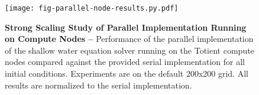
\begin{figure}

  \centering
  \texttt{[image: fig-parallel-node-results.py.pdf]}

  \caption{\textbf{Strong Scaling Study of Parallel Implementation
      Running on Compute Nodes --} Performance of the parallel
    implementation of the shallow water equation solver running on the
    Totient compute nodes compared against the provided serial
    implementation for all initial conditions. Experiments are on the
    default 200x200 grid. All results are normalized to the serial
    implementation. }

  \label{fig-parallel-node-results}

\end{figure}

